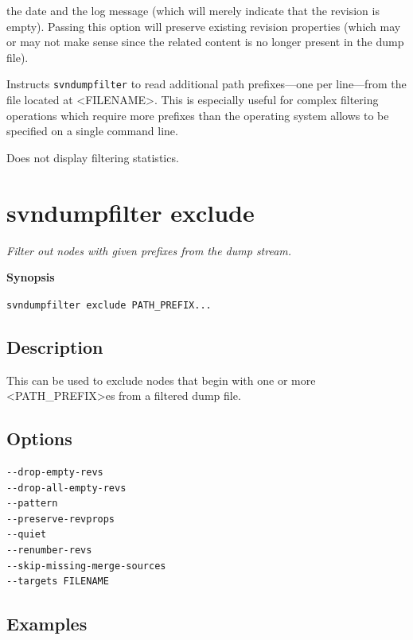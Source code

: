 \begin{description}
the date and the log message (which will merely indicate that the
revision is empty). Passing this option will preserve existing revision
properties (which may or may not make sense since the related content is
no longer present in the dump file).
\item[\protect\phantomsection\label{svn.ref.svndumpfilter.sw.targets}{}\texttt{-\/-targets}
\textless FILENAME\textgreater{}]
Instructs \texttt{svndumpfilter} to read additional path prefixes---one
per line---from the file located at \textless FILENAME\textgreater. This
is especially useful for complex filtering operations which require more
prefixes than the operating system allows to be specified on a single
command line.
\item[\protect\phantomsection\label{svn.ref.svndumpfilter.sw.quiet}{}\texttt{-\/-quiet}]
Does not display filtering statistics.
\end{description}

\section{svndumpfilter
exclude}\label{svn.ref.svndumpfilter.commands.c.exclude}

\emph{Filter out nodes with given prefixes from the dump stream.}

\textbf{Synopsis}

\texttt{svndumpfilter\ exclude\ PATH\_PREFIX...}

\subsection{Description}

This can be used to exclude nodes that begin with one or more
\textless PATH\_PREFIX\textgreater es from a filtered dump file.

\subsection{Options}

\begin{verbatim}
--drop-empty-revs
--drop-all-empty-revs
--pattern
--preserve-revprops
--quiet
--renumber-revs
--skip-missing-merge-sources
--targets FILENAME
\end{verbatim}

\subsection{Examples}

